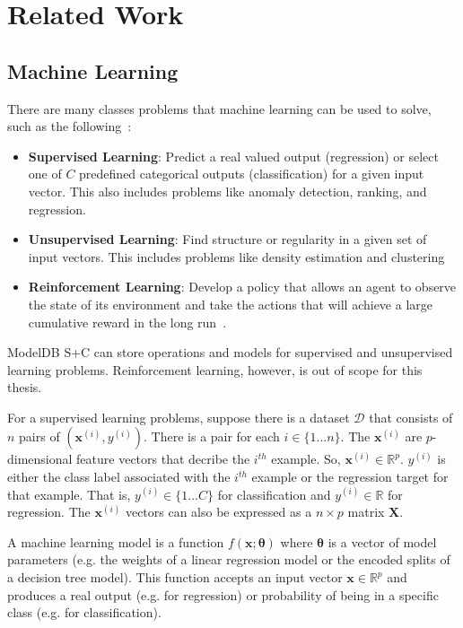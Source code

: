 \chapter{Related Work}

\section{Machine Learning}
There are many classes problems that machine learning can be used to solve, such
as the following~\cite{introtoml}:

\begin{itemize}
  \item \textbf{Supervised Learning}: Predict a real valued output (regression)
    or select one of $C$ predefined categorical outputs (classification)
    for a given input vector. This also includes problems like anomaly detection,
    ranking, and regression.
  \item \textbf{Unsupervised Learning}: Find structure or regularity in a given
    set of input vectors. This includes problems like density estimation and 
    clustering
  \item \textbf{Reinforcement Learning}: Develop a policy that allows an agent
    to observe the state of its environment and take the actions that will 
    achieve a large cumulative reward in the long run~\cite{introtorl}.
\end{itemize}

ModelDB S+C can store operations and models for supervised
and unsupervised learning problems. Reinforcement learning, however, is out
of scope for this thesis.

For a supervised learning problems, suppose there is a dataset $\mathcal{D}$ that
consists of $n$ pairs of $(\textbf{x}^{(i)}, y^{(i)})$. There is a
pair for each $i \in \{{1...n}\}$. The $\textbf{x}^{(i)}$ are $p$-dimensional feature
vectors that decribe the $i^{th}$ example. So, $\textbf{x}^{(i)} \in \mathbb{R}^{p}$. 
$y^{(i)}$ is either the class label associated with the $i^{th}$ example or
the regression target for that example. That is, $y^{(i)} \in \{1...C\}$ for classification
and $y^{(i)} \in \mathbb{R}$ for regression. The $\textbf{x}^{(i)}$ vectors
can also be expressed as a $n \times p$ matrix $\textbf{X}$.

A machine learning model is a function $f(\textbf{x}; \boldsymbol{\theta})$ where
$\boldsymbol{\theta}$ is a vector of model parameters (e.g. the weights of a linear regression
model or the encoded splits of a decision tree model). This function accepts an 
input vector $\textbf{x} \in \mathbb{R}^{p}$ and produces a real output (e.g. for regression)
or probability of being in a specific class (e.g. for classification).

